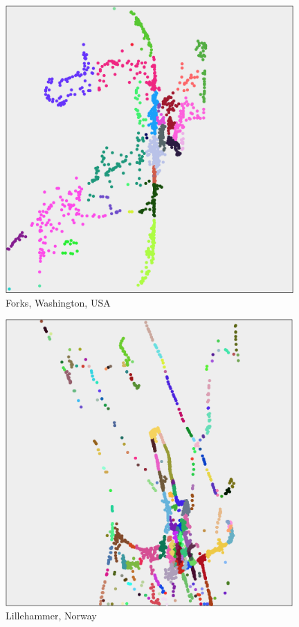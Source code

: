 \begin{appendices}
	\begin{figure}[H]
		\centering
		\includegraphics[width=11cm]{Images/computations/MINCUT2_FORKS.png}
		\caption{Forks, Washington, USA}
	\end{figure}

	\begin{figure}
		\centering
		\includegraphics[width=11cm]{Images/computations/MINCUT2_LILLEHAMMER.png}
		\caption{Lillehammer, Norway}
	\end{figure}


\end{appendices}
